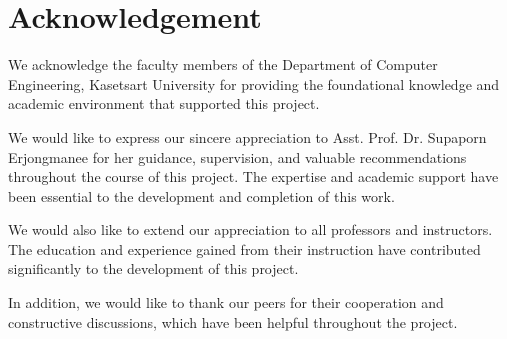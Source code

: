 \chapter*{Acknowledgement}
\label{chap:acknowledgement}

We acknowledge the faculty members of the Department of Computer Engineering, Kasetsart University for providing the foundational knowledge and academic environment that supported this project.

We would like to express our sincere appreciation to Asst. Prof. Dr. Supaporn Erjongmanee for her guidance, supervision, and valuable recommendations throughout the course of this project. The expertise and academic support have been essential to the development and completion of this work.

We would also like to extend our appreciation to all professors and instructors. The education and experience gained from their instruction have contributed significantly to the development of this project.

In addition, we would like to thank our peers for their cooperation and constructive discussions, which have been helpful throughout the project.

\vspace{.2in}
\begin{flushright}
    \usevar{\srsAuthorOne} \\
    \usevar{\srsAuthorTwo} \\
    \usevar{\srsAuthorThree}
\end{flushright}